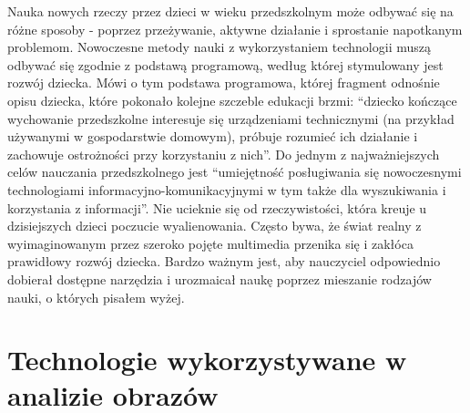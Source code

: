 \documentclass{article}
\begin{document}
	Nauka nowych rzeczy przez dzieci w wieku przedszkolnym może odbywać się na różne sposoby - poprzez przeżywanie, aktywne działanie i sprostanie napotkanym problemom. Nowoczesne metody nauki z wykorzystaniem technologii muszą odbywać się zgodnie z podstawą programową, według której stymulowany jest rozwój dziecka. Mówi o tym podstawa programowa, której fragment odnośnie opisu dziecka, które pokonało kolejne szczeble edukacji brzmi: “dziecko kończące wychowanie przedszkolne interesuje się urządzeniami technicznymi (na przykład używanymi w gospodarstwie domowym), próbuje rozumieć ich działanie i zachowuje ostrożności przy korzystaniu z nich”\cite{ref9}. Do jednym z najważniejszych celów nauczania przedszkolnego jest “umiejętność posługiwania się nowoczesnymi technologiami informacyjno-komunikacyjnymi w tym także dla wyszukiwania i korzystania z informacji”. Nie ucieknie się od rzeczywistości, która kreuje u dzisiejszych dzieci poczucie wyalienowania. Często bywa, że świat realny z wyimaginowanym przez szeroko pojęte multimedia przenika się i zakłóca prawidłowy rozwój dziecka. Bardzo ważnym jest, aby nauczyciel odpowiednio dobierał dostępne narzędzia i urozmaicał naukę poprzez mieszanie rodzajów nauki, o których pisałem wyżej.
	
	\section{Technologie wykorzystywane w analizie obrazów}
\end{document}
